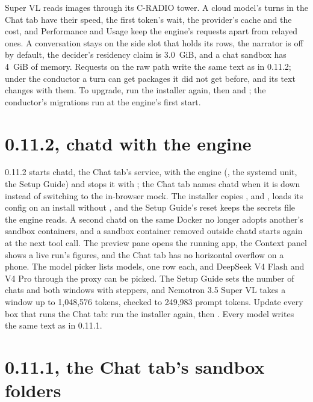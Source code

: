 Super VL reads images through its C-RADIO tower. A cloud model's turns in the Chat tab have their speed, the first token's wait, the provider's cache and the cost, and Performance and Usage keep the engine's requests apart from relayed ones. A conversation stays on the side slot that holds its rows, the narrator is off by default, the decider's residency claim is 3.0~GiB, and a chat sandbox has 4~GiB of memory. Requests on the raw path write the same text as in 0.11.2; under the conductor a turn can get packages it did not get before, and its text changes with them. To upgrade, run the installer again, then  and ; the conductor's migrations run at the engine's first start.

\section{0.11.2, chatd with the engine}\label{sec:changelog-0112}

0.11.2 starts chatd, the Chat tab's service, with the engine (, the systemd unit, the Setup Guide) and stops it with ; the Chat tab names chatd when it is down instead of switching to the in-browser mock. The installer copies ,  and ,  loads its config on an install without , and the Setup Guide's reset keeps the secrets file the engine reads. A second chatd on the same Docker no longer adopts another's sandbox containers, and a sandbox container removed outside chatd starts again at the next tool call. The preview pane opens the running app, the Context panel shows a live run's figures, and the Chat tab has no horizontal overflow on a phone. The model picker lists models, one row each, and DeepSeek V4 Flash and V4 Pro through the proxy can be picked. The Setup Guide sets the number of chats and both windows with steppers, and Nemotron 3.5 Super VL takes a window up to 1,048,576 tokens, checked to 249,983 prompt tokens. Update every box that runs the Chat tab: run the installer again, then . Every model writes the same text as in 0.11.1.

\section{0.11.1, the Chat tab's sandbox folders}\label{sec:changelog-0111}

